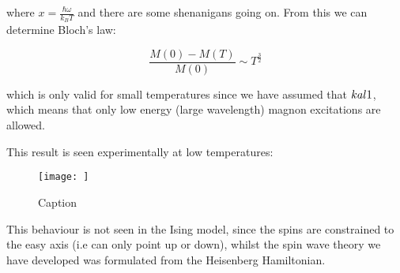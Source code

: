 \noindent where $x = \frac{\hbar \omega}{k_B T}$ and there are some shenanigans going on. From this we can determine Bloch's law:

\begin{equation}
    \frac{M(0) - M(T)}{M(0)} \sim T^{\frac{3}{2}}
    \label{Bloch3/2Law}
\end{equation}

\noindent which is only valid for small temperatures since we have assumed that $ka \\l 1$, which means that only low energy (large wavelength) magnon excitations are allowed.

\noindent This result is seen experimentally at low temperatures:

\begin{figure}
    \centering
    \texttt{[image: ]}
    \caption{Caption}
    \label{fig:enter-label}
\end{figure}

\noindent This behaviour is not seen in the Ising model, since the spins are constrained to the easy axis (i.e can only point up or down), whilst the spin wave theory we have developed was formulated from the Heisenberg Hamiltonian.




